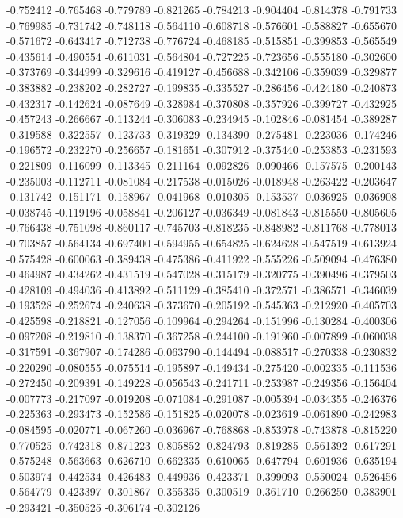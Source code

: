 -0.752412
-0.765468
-0.779789
-0.821265
-0.784213
-0.904404
-0.814378
-0.791733
-0.769985
-0.731742
-0.748118
-0.564110
-0.608718
-0.576601
-0.588827
-0.655670
-0.571672
-0.643417
-0.712738
-0.776724
-0.468185
-0.515851
-0.399853
-0.565549
-0.435614
-0.490554
-0.611031
-0.564804
-0.727225
-0.723656
-0.555180
-0.302600
-0.373769
-0.344999
-0.329616
-0.419127
-0.456688
-0.342106
-0.359039
-0.329877
-0.383882
-0.238202
-0.282727
-0.199835
-0.335527
-0.286456
-0.424180
-0.240873
-0.432317
-0.142624
-0.087649
-0.328984
-0.370808
-0.357926
-0.399727
-0.432925
-0.457243
-0.266667
-0.113244
-0.306083
-0.234945
-0.102846
-0.081454
-0.389287
-0.319588
-0.322557
-0.123733
-0.319329
-0.134390
-0.275481
-0.223036
-0.174246
-0.196572
-0.232270
-0.256657
-0.181651
-0.307912
-0.375440
-0.253853
-0.231593
-0.221809
-0.116099
-0.113345
-0.211164
-0.092826
-0.090466
-0.157575
-0.200143
-0.235003
-0.112711
-0.081084
-0.217538
-0.015026
-0.018948
-0.263422
-0.203647
-0.131742
-0.151171
-0.158967
-0.041968
-0.010305
-0.153537
-0.036925
-0.036908
-0.038745
-0.119196
-0.058841
-0.206127
-0.036349
-0.081843
-0.815550
-0.805605
-0.766438
-0.751098
-0.860117
-0.745703
-0.818235
-0.848982
-0.811768
-0.778013
-0.703857
-0.564134
-0.697400
-0.594955
-0.654825
-0.624628
-0.547519
-0.613924
-0.575428
-0.600063
-0.389438
-0.475386
-0.411922
-0.555226
-0.509094
-0.476380
-0.464987
-0.434262
-0.431519
-0.547028
-0.315179
-0.320775
-0.390496
-0.379503
-0.428109
-0.494036
-0.413892
-0.511129
-0.385410
-0.372571
-0.386571
-0.346039
-0.193528
-0.252674
-0.240638
-0.373670
-0.205192
-0.545363
-0.212920
-0.405703
-0.425598
-0.218821
-0.127056
-0.109964
-0.294264
-0.151996
-0.130284
-0.400306
-0.097208
-0.219810
-0.138370
-0.367258
-0.244100
-0.191960
-0.007899
-0.060038
-0.317591
-0.367907
-0.174286
-0.063790
-0.144494
-0.088517
-0.270338
-0.230832
-0.220290
-0.080555
-0.075514
-0.195897
-0.149434
-0.275420
-0.002335
-0.111536
-0.272450
-0.209391
-0.149228
-0.056543
-0.241711
-0.253987
-0.249356
-0.156404
-0.007773
-0.217097
-0.019208
-0.071084
-0.291087
-0.005394
-0.034355
-0.246376
-0.225363
-0.293473
-0.152586
-0.151825
-0.020078
-0.023619
-0.061890
-0.242983
-0.084595
-0.020771
-0.067260
-0.036967
-0.768868
-0.853978
-0.743878
-0.815220
-0.770525
-0.742318
-0.871223
-0.805852
-0.824793
-0.819285
-0.561392
-0.617291
-0.575248
-0.563663
-0.626710
-0.662335
-0.610065
-0.647794
-0.601936
-0.635194
-0.503974
-0.442534
-0.426483
-0.449936
-0.423371
-0.399093
-0.550024
-0.526456
-0.564779
-0.423397
-0.301867
-0.355335
-0.300519
-0.361710
-0.266250
-0.383901
-0.293421
-0.350525
-0.306174
-0.302126
